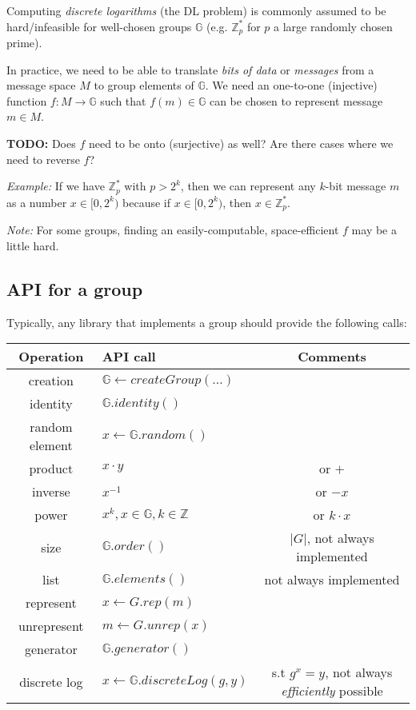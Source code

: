 \documentclass[11pt]{article}
\newcommand{\Zp}{\mathbb{Z}^{\ast}_p}
\newcommand{\G}{\mathbb{G}}
\newcommand{\note}{\emph{Note:} }
\newcommand{\example}{\emph{Example:} }
\begin{document}
Computing \emph{discrete logarithms} (the DL problem) is commonly assumed to be
hard/infeasible for well-chosen groups $\G$ (e.g. $\Zp$ for $p$ a large randomly
chosen prime).

In practice, we need to be able to translate \emph{bits of data} or
\emph{messages} from a message space $M$ to group elements of $\G$. We need an
one-to-one (injective) function $f : M
\rightarrow \G$ such that $f(m) \in \G$ can be chosen to represent message $m
\in M$.

\textbf{TODO:} Does $f$ need to be onto (surjective) as well? Are there cases
where we need to reverse $f$?

\example If we have $\Zp$ with $p > 2^k$, then we can represent any $k$-bit
message $m$ as a number $x \in [0, 2^k)$ because if $x \in [0, 2^k)$, then $x
\in \Zp$.

\note For some groups, finding an easily-computable, space-efficient $f$ may
be a little hard.

\subsection{API for a group}

Typically, any library that implements a group should provide the following calls:

\begin{center}
\begin{tabular}{ c | l | c }
Operation & API call & Comments \\
\hline\hline
creation & $\G \leftarrow createGroup(\dots)$ &\\
identity & $\G.identity()$ &\\
random element & $x \leftarrow \G.random()$ &\\
product & $x \cdot y$ & or $+$\\
inverse & $x^{-1}$ & or $-x$\\
power & $x^k, x \in \G, k \in \mathbb{Z}$ & or $k\cdot x$\\
size & $\G.order()$ & $|G|$, not always implemented\\
list & $\G.elements()$ & not always implemented\\
represent & $x \leftarrow G.rep(m)$ &\\
unrepresent & $m \leftarrow G.unrep(x)$ &\\
generator & $\G.generator()$ &\\
discrete log & $x \leftarrow \G.discreteLog(g, y)$ & s.t $g^x = y$, not always
\emph{efficiently} possible \\
\end{tabular}
\end{center}
\end{document}
